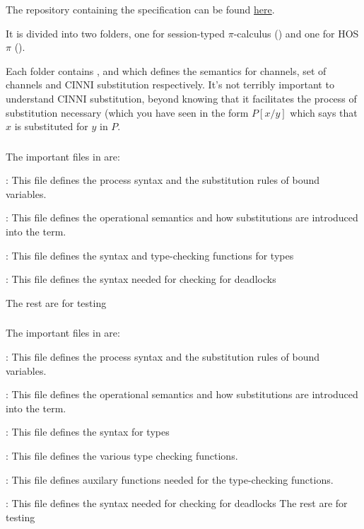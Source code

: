 The repository containing the specification can be found \href{https://gitlab.com/calrare1/session-types/-/tree/master}{here}.

It is divided into two folders, one for session-typed $\pi$-calculus () and one for HOS$\pi$ ().

Each folder contains ,  and  which defines the semantics for channels, set of channels and CINNI substitution respectively. It's not terribly important to understand CINNI substitution, beyond knowing that it facilitates the process of substitution necessary (which you have seen in the form $P[x/y]$ which says that $x$ is substituted for $y$ in $P$.

\subsubsection{}
The important files in  are:
\bi
    \item {}: This file defines the process syntax and the substitution rules of bound variables.
    \item {}: This file defines the operational semantics and how substitutions are introduced into the term.
    \item {}: This file defines the syntax and type-checking functions for types
    \item {}: This file defines the syntax needed for checking for deadlocks
\ei

The rest are for testing
\subsubsection{}
The important files in  are:
\bi
    \item {}: This file defines the process syntax and the substitution rules of bound variables.
    \item {}: This file defines the operational semantics and how substitutions are introduced into the term.
    \item {}: This file defines the syntax for types
    \item {}: This file defines the various type checking functions.
    \item {}: This file defines auxilary functions needed for the type-checking functions.
    \item {}: This file defines the syntax needed for checking for deadlocks
\ei
The rest are for testing